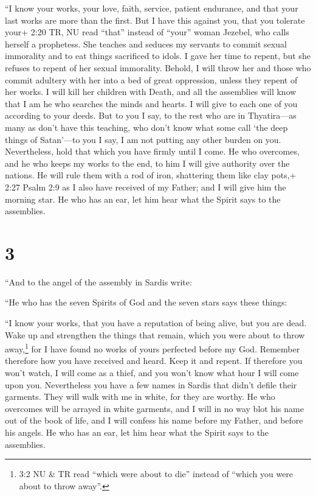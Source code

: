  ``I know your works, your love, faith, service, patient
endurance, and that your last works are more than the first.
 But I have this against you, that you tolerate your+ 2:20
TR, NU read ``that'' instead of ``your'' woman Jezebel, who calls
herself a prophetess. She teaches and seduces my servants to commit
sexual immorality and to eat things sacrificed to idols.  I
gave her time to repent, but she refuses to repent of her sexual
immorality.  Behold, I will throw her and those who commit
adultery with her into a bed of great oppression, unless they repent of
her works.  I will kill her children with Death, and all
the assemblies will know that I am he who searches the minds and hearts.
I will give to each one of you according to your deeds. 
But to you I say, to the rest who are in Thyatira---as many as don't
have this teaching, who don't know what some call `the deep things of
Satan'---to you I say, I am not putting any other burden on you.
 Nevertheless, hold that which you have firmly until I
come.  He who overcomes, and he who keeps my works to the
end, to him I will give authority over the nations.  He
will rule them with a rod of iron, shattering them like clay pots,+ 2:27
Psalm 2:9 as I also have received of my Father;  and I will
give him the morning star.  He who has an ear, let him hear
what the Spirit says to the assemblies.

\hypertarget{section-2}{%
\section{3}\label{section-2}}

 ``And to the angel of the assembly in Sardis write:

``He who has the seven Spirits of God and the seven stars says these
things:

``I know your works, that you have a reputation of being alive, but you
are dead.  Wake up and strengthen the things that remain,
which you were about to throw away,\footnote{3:2 NU \& TR read ``which
  were about to die'' instead of ``which you were about to throw away''.}
for I have found no works of yours perfected before my God. 
Remember therefore how you have received and heard. Keep it and repent.
If therefore you won't watch, I will come as a thief, and you won't know
what hour I will come upon you.  Nevertheless you have a few
names in Sardis that didn't defile their garments. They will walk with
me in white, for they are worthy.  He who overcomes will be
arrayed in white garments, and I will in no way blot his name out of the
book of life, and I will confess his name before my Father, and before
his angels.  He who has an ear, let him hear what the Spirit
says to the assemblies.

